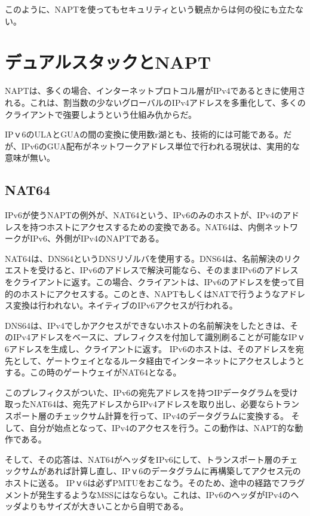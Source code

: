 このように、NAPTを使ってもセキュリティという観点からは何の役にも立たない。

\section{デュアルスタックとNAPT}
NAPTは、多くの場合、インターネットプロトコル層がIPv4であるときに使用される。これは、割当数の少ないグローバルのIPv4アドレスを多重化して、多くのクライアントで強要しようという仕組み仇からだ。

IPｖ6のULAとGUAの間の変換に使用数r湖とも、技術的には可能である。だが、IPv6のGUA配布がネットワークアドレス単位で行われる現状は、実用的な意味が無い。

\subsection{NAT64}

IPv6が使うNAPTの例外が、NAT64という、IPv6のみのホストが、IPv4のアドレスを持つホストにアクセスするための変換である。NAT64は、内側ネットワークがIPv6、外側がIPv4のNAPTである。

NAT64は、DNS64というDNSリゾルバを使用する。DNS64は、名前解決のリクエストを受けると、IPv6のアドレスで解決可能なら、そのままIPv6のアドレスをクライアントに返す。この場合、クライアントは、IPv6のアドレスを使って目的のホストにアクセスする。このとき、NAPTもしくはNATで行うようなアドレス変換は行われない。ネイティブのIPv6アクセスが行われる。

DNS64は、IPv4でしかアクセスができないホストの名前解決をしたときは、そのIPv4アドレスをベースに、プレフィクスを付加して識別刷ることが可能なIPｖ6アドレスを生成し、クライアントに返す。
IPv6のホストは、そのアドレスを宛先として、ゲートウェイとなるルータ経由でインターネットにアクセスしようとする。この時のゲートウェイがNAT64となる。

このプレフィクスがついた、IPv6の宛先アドレスを持つIPデータグラムを受け取ったNAT64は、宛先アドレスからIPv4アドレスを取り出し、必要ならトランスポート層のチェックサム計算を行って、IPv4のデータグラムに変換する。
そして、自分が始点となって、IPv4のアクセスを行う。この動作は、NAPT的な動作である。

そして、その応答は、NAT64がヘッダをIPv6にして、トランスポート層のチェックサムがあれば計算し直し、IPｖ6のデータグラムに再構築してアクセス元のホストに送る。
IPｖ6は必ずPMTUをおこなう。そのため、途中の経路でフラグメントが発生するようなMSSにはならない。これは、IPv6のヘッダがIPv4のヘッダよりもサイズが大きいことから自明である。